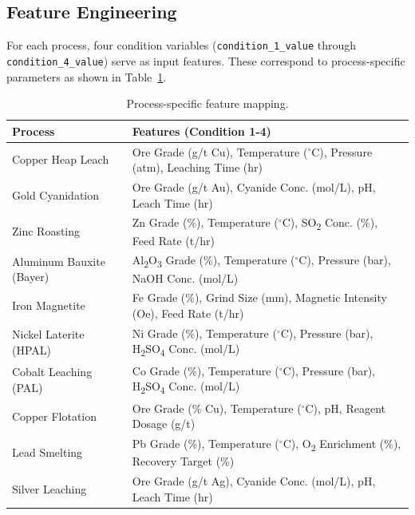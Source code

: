 \documentclass[12pt,a4paper]{report}
\newcommand{\code}[1]{\texttt{#1}}
\begin{document}
\subsection{Feature Engineering}
For each process, four condition variables (\code{condition\_1\_value} through \code{condition\_4\_value}) serve as input features. These correspond to process-specific parameters as shown in Table~\ref{tab:features}.
\begin{table}[H]
\centering
\caption{Process-specific feature mapping.}
\label{tab:features}
\footnotesize
\begin{tabularx}{\textwidth}{@{} l X @{}}
\toprule
\textbf{Process} & \textbf{Features (Condition 1-4)} \\
\midrule
Copper Heap Leach          & Ore Grade (g/t Cu), Temperature ($^\circ$C), Pressure (atm), Leaching Time (hr) \\
Gold Cyanidation           & Ore Grade (g/t Au), Cyanide Conc. (mol/L), pH, Leach Time (hr) \\
Zinc Roasting              & Zn Grade (\%), Temperature ($^\circ$C), SO\textsubscript{2} Conc. (\%), Feed Rate (t/hr) \\
Aluminum Bauxite (Bayer)   & Al\textsubscript{2}O\textsubscript{3} Grade (\%), Temperature ($^\circ$C), Pressure (bar), NaOH Conc. (mol/L) \\
Iron Magnetite             & Fe Grade (\%), Grind Size (mm), Magnetic Intensity (Oe), Feed Rate (t/hr) \\
Nickel Laterite (HPAL)     & Ni Grade (\%), Temperature ($^\circ$C), Pressure (bar), H\textsubscript{2}SO\textsubscript{4} Conc. (mol/L) \\
Cobalt Leaching (PAL)      & Co Grade (\%), Temperature ($^\circ$C), Pressure (bar), H\textsubscript{2}SO\textsubscript{4} Conc. (mol/L) \\
Copper Flotation           & Ore Grade (\% Cu), Temperature ($^\circ$C), pH, Reagent Dosage (g/t) \\
Lead Smelting              & Pb Grade (\%), Temperature ($^\circ$C), O\textsubscript{2} Enrichment (\%), Recovery Target (\%) \\
Silver Leaching            & Ore Grade (g/t Ag), Cyanide Conc. (mol/L), pH, Leach Time (hr) \\
\bottomrule
\end{tabularx}
\end{table}
\end{document}
